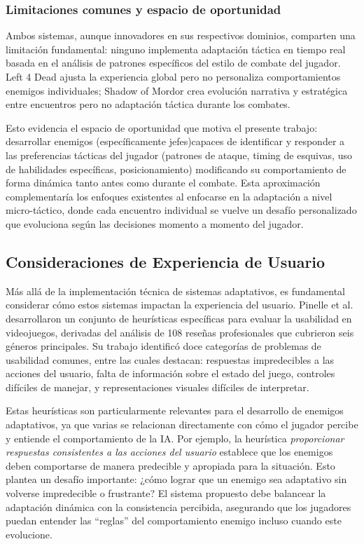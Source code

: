 \documentclass[informe]{upropuesta}
\begin{document}
\subsubsection*{Limitaciones comunes y espacio de oportunidad}

Ambos sistemas, aunque innovadores en sus respectivos dominios, comparten una limitación fundamental: ninguno implementa adaptación táctica en tiempo real basada en el análisis de patrones específicos del estilo de combate del jugador. Left 4 Dead ajusta la experiencia global pero no personaliza comportamientos enemigos individuales; Shadow of Mordor crea evolución narrativa y estratégica entre encuentros pero no adaptación táctica durante los combates.

Esto evidencia el espacio de oportunidad que motiva el presente trabajo: desarrollar enemigos (específicamente jefes)capaces de identificar y responder a las preferencias tácticas del jugador (patrones de ataque, timing de esquivas, uso de habilidades específicas, posicionamiento) modificando su comportamiento de forma dinámica tanto antes como durante el combate. Esta aproximación complementaría los enfoques existentes al enfocarse en la adaptación a nivel micro-táctico, donde cada encuentro individual se vuelve un desafío personalizado que evoluciona según las decisiones momento a momento del jugador.

\subsection{Consideraciones de Experiencia de Usuario}

Más allá de la implementación técnica de sistemas adaptativos, es fundamental considerar cómo estos sistemas impactan la experiencia del usuario. Pinelle et al. \cite{Pinelle08} desarrollaron un conjunto de heurísticas específicas para evaluar la usabilidad en videojuegos, derivadas del análisis de 108 reseñas profesionales que cubrieron seis géneros principales. Su trabajo identificó doce categorías de problemas de usabilidad comunes, entre las cuales destacan: respuestas impredecibles a las acciones del usuario, falta de información sobre el estado del juego, controles difíciles de manejar, y representaciones visuales difíciles de interpretar.

Estas heurísticas son particularmente relevantes para el desarrollo de enemigos adaptativos, ya que varias se relacionan directamente con cómo el jugador percibe y entiende el comportamiento de la IA. Por ejemplo, la heurística \textit{proporcionar respuestas consistentes a las acciones del usuario} establece que los enemigos deben comportarse de manera predecible y apropiada para la situación. Esto plantea un desafío importante: ¿cómo lograr que un enemigo sea adaptativo sin volverse impredecible o frustrante? El sistema propuesto debe balancear la adaptación dinámica con la consistencia percibida, asegurando que los jugadores puedan entender las ``reglas'' del comportamiento enemigo incluso cuando este evolucione.
\end{document}
